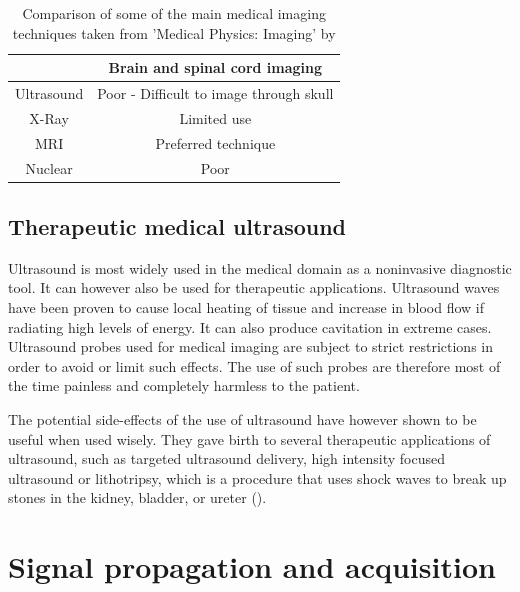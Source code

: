 \begin{table}[!ht]
\begin{tabular}{| c || c |}
  \hline\hline
  
    &   Brain and spinal cord imaging   \\
  \hline
  Ultrasound  & Poor - Difficult to image through skull \\
  X-Ray & Limited use \\
  MRI   & Preferred technique \\
  Nuclear   & Poor \\
  \hline
 \end{tabular}
\caption{Comparison of some of the main medical imaging techniques taken from 'Medical Physics: Imaging' by \cite{medical_physics}}
\label{table:medical_imaging}
\end{table}

\subsection{Therapeutic medical ultrasound}
Ultrasound is most widely used in the medical domain as a noninvasive diagnostic tool. It can however also be used for therapeutic applications. Ultrasound waves have been proven to cause local heating of tissue and increase in blood flow if radiating high levels of energy. It can also produce cavitation in extreme cases.
Ultrasound probes used for medical imaging are subject to strict restrictions in order to avoid or limit such effects. The use of such probes are therefore most of the time painless and completely harmless to the patient.

The potential side-effects of the use of ultrasound have however shown to be useful when used wisely. They gave birth to several therapeutic applications of ultrasound, such as targeted ultrasound delivery, high intensity focused ultrasound or lithotripsy, which is a procedure that uses shock waves to break up stones in the kidney, bladder, or ureter (\cite{lithotripsy}).

\section{Signal propagation and acquisition}
\label{sec:signals}

